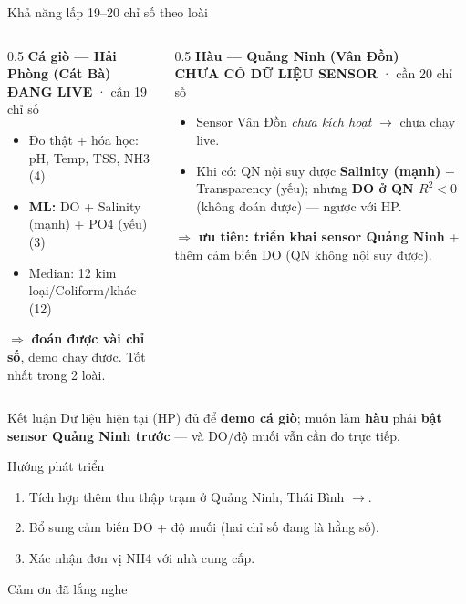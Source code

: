 \documentclass[aspectratio=169]{beamer}
\begin{document}
\begin{frame}{Khả năng lấp 19--20 chỉ số theo loài}
  \begin{columns}[T]
    \begin{column}{0.5\textwidth}
      \footnotesize
      \textbf{Cá giò --- Hải Phòng (Cát Bà)} \\ \textcolor{green!50!black}{\textbf{ĐANG LIVE}} · cần 19 chỉ số
      \begin{itemize}\small
        \item Đo thật + hóa học: pH, Temp, TSS, NH3 (4)
        \item \textbf{ML:} DO + Salinity (mạnh) + PO4 (yếu) (3)
        \item Median: 12 kim loại/Coliform/khác (12)
      \end{itemize}
      $\Rightarrow$ \textbf{đoán được vài chỉ số}, demo chạy được. Tốt nhất trong 2 loài.
    \end{column}
    \begin{column}{0.5\textwidth}
      \footnotesize
      \textbf{Hàu --- Quảng Ninh (Vân Đồn)} \\ \textcolor{red!70!black}{\textbf{CHƯA CÓ DỮ LIỆU SENSOR}} · cần 20 chỉ số
      \begin{itemize}\small
        \item Sensor Vân Đồn \emph{chưa kích hoạt} $\to$ chưa chạy live.
        \item Khi có: QN nội suy được \textbf{Salinity (mạnh)} + Transparency (yếu); nhưng \textbf{DO ở QN $R^2<0$} (không đoán được) --- ngược với HP.
      \end{itemize}
      $\Rightarrow$ \textbf{ưu tiên: triển khai sensor Quảng Ninh} + thêm cảm biến DO (QN không nội suy được).
    \end{column}
  \end{columns}
  \vfill
  \begin{block}{Kết luận}
    Dữ liệu hiện tại (HP) đủ để \textbf{demo cá giò}; muốn làm \textbf{hàu} phải \textbf{bật sensor Quảng Ninh trước} --- và DO/độ muối vẫn cần đo trực tiếp.
  \end{block}
\end{frame}

\begin{frame}{Hướng phát triển}
  \begin{enumerate}
    \item Tích hợp thêm thu thập trạm ở Quảng Ninh, Thái Bình $\to$.
    \item Bổ sung cảm biến DO + độ muối (hai chỉ số đang là hằng số).
    \item Xác nhận đơn vị NH4 với nhà cung cấp.
  \end{enumerate}
\end{frame}

\begin{frame}[plain]
  \centering\vfill
  {\Large Cảm ơn đã lắng nghe}\\[4pt]
  \vfill
\end{frame}
\end{document}

